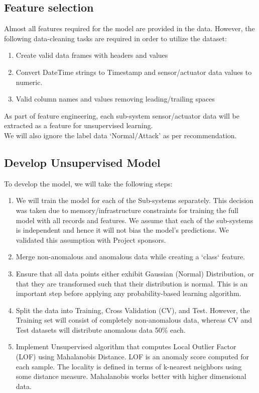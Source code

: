 \documentclass{article}
\begin{document}
\subsection{Feature selection} \label{featureSelection}
Almost all features required for the model are provided in the data. However, the following data-cleaning tasks are required in order to utilize the dataset: 
\begin{enumerate}
    \item Create valid data frames with headers and values
    \item Convert DateTime strings to Timestamp and sensor/actuator data values to numeric.
    \item Valid column names and values removing leading/trailing spaces    
\end{enumerate}
As part of feature engineering, each sub-system sensor/actuator data will be extracted as a feature for unsupervised learning. \\
We will also ignore the label data `Normal/Attack' as per recommendation.

\subsection{Develop Unsupervised Model}
To develop the model, we will take the following steps: 
\begin{enumerate}
    \item We will train the model for each of the Sub-systems separately. This decision was taken due to memory/infrastructure constraints for training the full model with all records and features. We assume that each of the sub-systems is independent and hence it will not bias the model's predictions. We validated this assumption with Project sponsors. 
    \item Merge non-anomalous and anomalous data while creating a `class` feature.
    \item Ensure that all data points either exhibit Gaussian (Normal) Distribution, or that they are transformed such that their distribution is normal. This is an important step before applying any probability-based learning algorithm.  
    \item Split the data into Training, Cross Validation (CV), and Test. However, the Training set will consist of completely non-anomalous data, whereas CV and Test datasets will distribute anomalous data 50\% each.
    \item Implement Unsupervised algorithm that computes Local Outlier Factor (LOF)\cite{three} using Mahalanobis Distance. LOF is an anomaly score computed for each sample. The locality is defined in terms of k-nearest neighbors using some distance measure. Mahalanobis works better with higher dimensional data.    
\end{enumerate}
\end{document}
